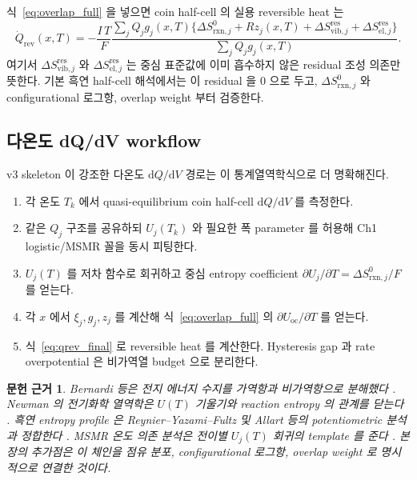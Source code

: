 \documentclass[11pt,a4paper]{article}
\newtheorem*{srcbox}{문헌 근거}
\newcommand{\dd}{\mathrm{d}}
\newcommand{\rxn}{\mathrm{rxn}}
\newcommand{\rev}{\mathrm{rev}}
\newcommand{\oc}{\mathrm{oc}}
\newcommand{\vib}{\mathrm{vib}}
\newcommand{\el}{\mathrm{el}}
\begin{document}
식~\eqref{eq:overlap_full} 을 넣으면 coin half-cell 의 실용 reversible heat 는
\begin{equation}
\dot Q_\rev(x,T)
=-\frac{I\,T}{F}
\frac{\sum_j Q_jg_j(x,T)\{\Delta S_{\rxn,j}^0+Rz_j(x,T)
 +\Delta S_{\vib,j}^{\mathrm{res}}+\Delta S_{\el,j}^{\mathrm{res}}\}}
     {\sum_j Q_jg_j(x,T)}.
\label{eq:qrev_overlap}
\end{equation}
여기서 $\Delta S_{\vib,j}^{\mathrm{res}}$ 와 $\Delta S_{\el,j}^{\mathrm{res}}$ 는 중심 표준값에 이미
흡수하지 않은 residual 조성 의존만 뜻한다. 기본 흑연 half-cell 해석에서는 이 residual 을 0 으로 두고,
$\Delta S_{\rxn,j}^0$ 와 configurational 로그항, overlap weight 부터 검증한다.

\subsection{다온도 dQ/dV workflow}
v3 skeleton 이 강조한 다온도 $\dd Q/\dd V$ 경로는 이 통계열역학식으로 더 명확해진다.
\begin{enumerate}[leftmargin=1.7em,itemsep=2pt]
\item 각 온도 $T_k$ 에서 quasi-equilibrium coin half-cell $\dd Q/\dd V$ 를 측정한다.
\item 같은 $Q_j$ 구조를 공유하되 $U_j(T_k)$ 와 필요한 폭 parameter 를 허용해 Ch1 logistic/MSMR 꼴을
동시 피팅한다.
\item $U_j(T)$ 를 저차 함수로 회귀하고 중심 entropy coefficient
$\partial U_j/\partial T=\Delta S_{\rxn,j}^0/F$ 를 얻는다.
\item 각 $x$ 에서 $\xi_j,g_j,z_j$ 를 계산해 식~\eqref{eq:overlap_full} 의
$\partial U_\oc/\partial T$ 를 얻는다.
\item 식~\eqref{eq:qrev_final} 로 reversible heat 를 계산한다. Hysteresis gap 과 rate overpotential 은
비가역열 budget 으로 분리한다.
\end{enumerate}

\begin{srcbox}
Bernardi 등은 전지 에너지 수지를 가역항과 비가역항으로 분해했다 \cite{bernardi1985}. Newman 의
전기화학 열역학은 $U(T)$ 기울기와 reaction entropy 의 관계를 닫는다 \cite{newman}. 흑연 entropy
profile 은 Reynier--Yazami--Fultz 및 Allart 등의 potentiometric 분석과 정합한다
\cite{reynier2003,allart2018}. MSMR 온도 의존 분석은 전이별 $U_j(T)$ 회귀의 template 를 준다
\cite{msmr_partI,msmr_partII}. 본 장의 추가점은 이 체인을 점유 분포, configurational 로그항,
overlap weight 로 명시적으로 연결한 것이다.
\end{srcbox}
\end{document}
